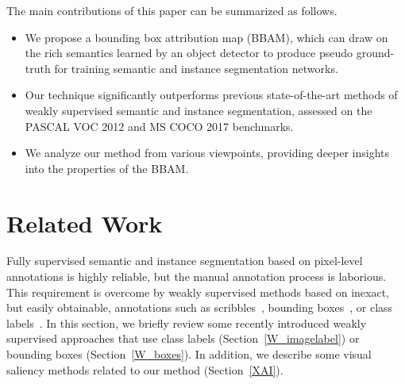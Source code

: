 \documentclass[final]{cvpr}
\begin{document}
The main contributions of this paper can be summarized as follows.
\begin{itemize}
\vspace{-4pt}
	\item[] We propose a bounding box attribution map (BBAM), which can draw on the rich semantics learned by an object detector to produce pseudo ground-truth for training semantic and instance segmentation networks.
	\vspace{-5pt}
	\item[] Our technique significantly outperforms previous state-of-the-art methods of weakly supervised semantic and instance segmentation, assessed on the PASCAL VOC 2012 and MS COCO 2017 benchmarks.
	\vspace{-5pt}
	\item[] We analyze our method from various viewpoints, providing deeper insights into the properties of the BBAM.
\end{itemize}


\section{Related Work}
Fully supervised semantic and instance segmentation based on pixel-level annotations is highly reliable, but the manual annotation process is laborious. This requirement is overcome by weakly supervised methods based on inexact, but easily obtainable, annotations such as scribbles~\cite{tang2018normalized}, bounding boxes~\cite{song2019box, khoreva2017simple}, or class labels~\cite{lee2019ficklenet, ahn2019weakly, sun2020mining}. In this section, we briefly review some recently introduced weakly supervised approaches that use class labels (Section~\ref{W_imagelabel}) or bounding boxes (Section~\ref{W_boxes}). In addition, we describe some visual saliency methods related to our method (Section~\ref{XAI}).
\end{document}

